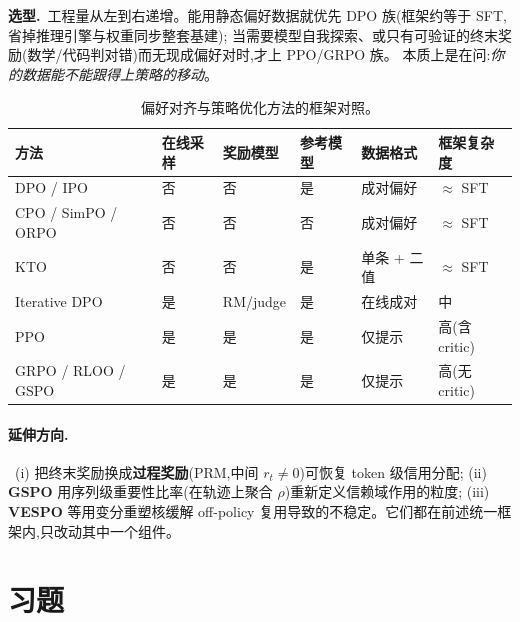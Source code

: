 \documentclass[11pt]{article}
\theoremstyle{plain}
\theoremstyle{definition}
\theoremstyle{remark}
\begin{document}
\textbf{选型.}\ 工程量从左到右递增。能用静态偏好数据就优先 DPO 族(框架约等于 SFT,省掉推理引擎与权重同步整套基建);
当需要模型自我探索、或只有可验证的终末奖励(数学/代码判对错)而无现成偏好对时,才上 PPO/GRPO 族。
本质上是在问:\emph{你的数据能不能跟得上策略的移动}。

\begin{table}[h]\centering\small
\begin{tabular}{@{}llllll@{}}
\toprule
方法 & 在线采样 & 奖励模型 & 参考模型 & 数据格式 & 框架复杂度\\
\midrule
DPO / IPO & 否 & 否 & 是 & 成对偏好 & $\approx$ SFT\\
CPO / SimPO / ORPO & 否 & 否 & 否 & 成对偏好 & $\approx$ SFT\\
KTO & 否 & 否 & 是 & 单条 + 二值 & $\approx$ SFT\\
Iterative DPO & 是 & RM/judge & 是 & 在线成对 & 中\\
PPO & 是 & 是 & 是 & 仅提示 & 高(含 critic)\\
GRPO / RLOO / GSPO & 是 & 是 & 是 & 仅提示 & 高(无 critic)\\
\bottomrule
\end{tabular}
\caption{偏好对齐与策略优化方法的框架对照。}
\end{table}

\paragraph{延伸方向.}\ (i) 把终末奖励换成\textbf{过程奖励}(PRM,中间 $r_t\ne0$)可恢复 token 级信用分配;
(ii) \textbf{GSPO} 用序列级重要性比率(在轨迹上聚合 $\rho$)重新定义信赖域作用的粒度;
(iii) \textbf{VESPO} 等用变分重塑核缓解 off-policy 复用导致的不稳定。它们都在前述统一框架内,只改动其中一个组件。

\section*{习题}
\end{document}
